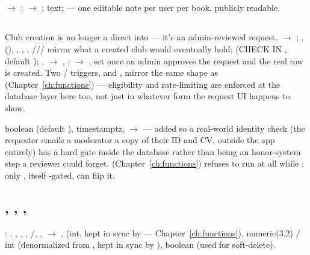 \subsection*{}
 $\to$ ;  $\to$ ;  text;  — one editable note per user per book, publicly readable.

\subsection*{}
Club creation is no longer a direct  into  — it's an admin-reviewed request.  $\to$ ; ,  (), , , , /// mirror what a created club would eventually hold;  (CHECK IN , default ); ,  $\to$ , ;  $\to$ , set once an admin approves the request and the real  row is created. Two / triggers,  and , mirror the same shape as  (Chapter~\ref{ch:functions}) — eligibility and rate-limiting are enforced at the database layer here too, not just in whatever form the request UI happens to show.

 boolean (default ),  timestamptz,  $\to$  — added so a real-world identity check (the requester emails a moderator a copy of their ID and CV, outside the app entirely) has a hard gate inside the database rather than being an honor-system step a reviewer could forget.  (Chapter~\ref{ch:functions}) refuses to run at all while ; only , itself -gated, can flip it.

\subsection*{, , , }
: , , , , /, ,  $\to$ ,  (int, kept in sync by  — Chapter~\ref{ch:functions}),  numeric(3,2) /  int (denormalized from , kept in sync by ),  boolean (used for soft-delete).

